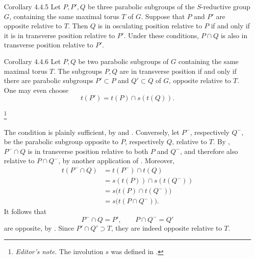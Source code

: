 \begin{sgastatement}{Corollary 4.4.5}
Let \(P,P',Q\) be three parabolic subgroups of the \(S\)-reductive
group \(G\), containing the same maximal torus \(T\) of \(G\).
Suppose that \(P\) and \(P'\) are opposite relative to \(T\).  Then
\(Q\) is in osculating position relative to \(P\) if and only if it is
in transverse position relative to \(P'\).  Under these conditions,
\(P\cap Q\) is also in transverse position relative to \(P'\).
\end{sgastatement}

\begin{sgastatement}{Corollary 4.4.6}
Let \(P,Q\) be two parabolic subgroups of \(G\) containing the same
maximal torus \(T\).  The subgroups \(P,Q\) are in transverse position
if and only if there are parabolic subgroups \(P'\subset P\) and
\(Q'\subset Q\) of \(G\), opposite relative to \(T\).  One may even
choose
\[
 t(P')=t(P)\cap s(t(Q)).
\]
\end{sgastatement}
\footnote{\emph{Editor's note.} The involution \(s\) was defined in
.}

The condition is plainly sufficient, by \textup{} and
\textup{}.  Conversely, let \(P^-\), respectively \(Q^-\),
be the parabolic subgroup opposite to \(P\), respectively \(Q\),
relative to \(T\).  By , \(P^-\cap Q\) is in transverse position
relative to both \(P\) and \(Q^-\), and therefore also relative to
\(P\cap Q^-\), by another application of .  Moreover,
\[
\begin{aligned}
 t(P^-\cap Q)
 &=t(P^-)\cap t(Q)\\
 &=s(t(P))\cap s(t(Q^-))\\
 &=s\bigl(t(P)\cap t(Q^-)\bigr)\\
 &=s\bigl(t(P\cap Q^-)\bigr).
\end{aligned}
\]
It follows that
\[
 P^-\cap Q=P',\qquad P\cap Q^-=Q'
\]
are opposite, by \textup{}.  Since \(P'\cap Q'\supset T\),
they are indeed opposite relative to \(T\).


